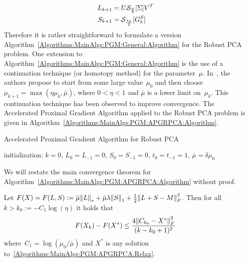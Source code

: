\documentclass{../../common/projectreport}
\begin{document}
\begin{align}
L_{k+1} &= U {\mathcal{S}}_\frac{\mu}{2}[\Sigma] V^T \label{Algorithms:MainAlgs:PGM:APGRPCA:LIterate} \\
S_{k+1} &= {\mathcal{S}}_\frac{\lambda\mu}{2}[G_k^S] \label{Algorithms:MainAlgs:PGM:APGRPCA:SIterate}
\end{align}
Therefore it is rather straightforward to formulate a version Algorithm~\ref{Algorithms:MainAlgs:PGM:General:Algorithm} for the Robust PCA problem. One extension to Algorithm~\ref{Algorithms:MainAlgs:PGM:General:Algorithm} is the use of a continuation technique (or homotopy method) for the parameter~$\mu$. In~\cite{Lin:2009kx}, the authors propose to start from some large value~$\mu_0$ and then choose~$\mu_{k+1} = \max(\eta \mu_k,\bar{\mu})$, where $0<\eta<1$ and $\bar{\mu}$ is a lower limit on~$\mu_k$. This continuation technique has been observed to improve convergence. The Accelerated Proximal Gradient Algorithm applied to the Robust PCA problem is given in Algorithm~\ref{Algorithms:MainAlgs:PGM:APGRPCA:Algorithm}.
%
\begin{algorithm}
\caption{Accelerated Proximal Gradient Algorithm for Robust PCA}
initialization: $k=0$, $L_0=L_{-1}=0$, $S_0=S_{-1}= 0$, $t_0=t_{-1} = 1$, $\bar{\mu} = \delta \mu_0$\;
\label{Algorithms:MainAlgs:PGM:APGRPCA:Algorithm}
\end{algorithm}

We will restate the main convergence theorem for Algorithm~\ref{Algorithms:MainAlgs:PGM:APGRPCA:Algorithm} without proof. 

\begin{theorem}
Let $F(X) = F(L,S) := \bar{\mu} {\left\|L\right\|}_{*}^{} + \bar{\mu} \lambda {\left\|S\right\|}_{1}^{} + \frac{1}{2} {\left\|L+S-M\right\|}_{F}^{2}$. Then for all $k>k_0 := -C_1\log(\eta)$ it holds that
\begin{align*}
F(X_k) - F(X^*) \leq \frac{4{\left\|C_{k_0}-X^*\right\|}_{F}^{2}}{(k-k_0+1)^2}
\end{align*}
where~$C_1 = \log(\mu_0/\bar{\mu})$ and $X^*$ is any solution to~\eqref{Algorithms:MainAlgs:PGM:APGRPCA:Relax}.
\end{theorem}
\end{document}
